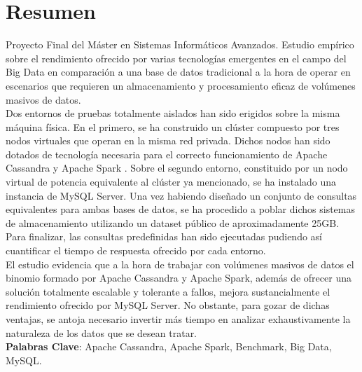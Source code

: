 \section*{Resumen}

Proyecto Final del Máster en Sistemas Informáticos Avanzados. Estudio empírico sobre el rendimiento ofrecido por varias tecnologías emergentes en el campo del Big Data en comparación a una base de datos tradicional a la hora de operar en escenarios que requieren un almacenamiento y procesamiento eficaz de volúmenes masivos de datos.\\

Dos entornos de pruebas totalmente aislados han sido erigidos sobre la misma máquina física. En el primero, se ha construido un clúster compuesto por tres nodos virtuales que operan en la misma red privada. Dichos nodos han sido dotados de tecnología necesaria para el correcto funcionamiento de Apache Cassandra \cite{lakshman2010cassandra} y Apache Spark \cite{zaharia2010spark}. Sobre el segundo entorno, constituido por un nodo virtual de potencia equivalente al clúster ya mencionado, se ha instalado una instancia de MySQL Server. Una vez habiendo diseñado un conjunto de consultas equivalentes para ambas bases de datos, se ha procedido a poblar dichos sistemas de almacenamiento utilizando un dataset público de aproximadamente 25GB. Para finalizar, las consultas predefinidas han sido ejecutadas pudiendo así cuantificar el tiempo de respuesta ofrecido por cada entorno.\\

El estudio evidencia que a la hora de trabajar con volúmenes masivos de datos el binomio formado por Apache Cassandra y Apache Spark, además de ofrecer una solución totalmente escalable y tolerante a fallos, mejora sustancialmente el rendimiento ofrecido por MySQL Server. No obstante, para gozar de dichas ventajas, se antoja necesario invertir más tiempo en analizar exhaustivamente la naturaleza de los datos que se desean tratar.\\

\textbf{Palabras Clave}: Apache Cassandra, Apache Spark, Benchmark, Big Data, MySQL.
